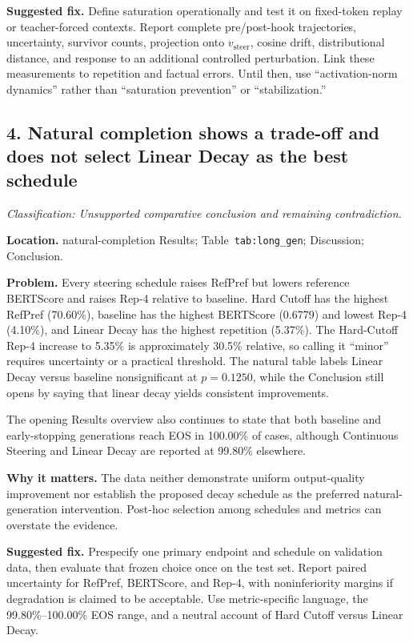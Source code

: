 \documentclass[11pt]{article}
\newcommand{\findinglabel}[1]{\textbf{#1}}
\newcommand{\classification}[1]{\textit{Classification: #1.}}
\begin{document}
\findinglabel{Suggested fix.} Define saturation operationally and test it on fixed-token replay or teacher-forced contexts.  Report complete pre/post-hook trajectories, uncertainty, survivor counts, projection onto $v_{\text{steer}}$, cosine drift, distributional distance, and response to an additional controlled perturbation.  Link these measurements to repetition and factual errors.  Until then, use ``activation-norm dynamics'' rather than ``saturation prevention'' or ``stabilization.''

\subsection*{4. Natural completion shows a trade-off and does not select Linear Decay as the best schedule}

\classification{Unsupported comparative conclusion and remaining contradiction}

\findinglabel{Location.} natural-completion Results; Table~\texttt{tab:long\_gen}; Discussion; Conclusion.

\findinglabel{Problem.} Every steering schedule raises RefPref but lowers reference BERTScore and raises Rep-4 relative to baseline.  Hard Cutoff has the highest RefPref (70.60\%), baseline has the highest BERTScore (0.6779) and lowest Rep-4 (4.10\%), and Linear Decay has the highest repetition (5.37\%).  The Hard-Cutoff Rep-4 increase to 5.35\% is approximately 30.5\% relative, so calling it ``minor'' requires uncertainty or a practical threshold.  The natural table labels Linear Decay versus baseline nonsignificant at $p=0.1250$, while the Conclusion still opens by saying that linear decay yields consistent improvements.

The opening Results overview also continues to state that both baseline and early-stopping generations reach EOS in 100.00\% of cases, although Continuous Steering and Linear Decay are reported at 99.80\% elsewhere.

\findinglabel{Why it matters.} The data neither demonstrate uniform output-quality improvement nor establish the proposed decay schedule as the preferred natural-generation intervention.  Post-hoc selection among schedules and metrics can overstate the evidence.

\findinglabel{Suggested fix.} Prespecify one primary endpoint and schedule on validation data, then evaluate that frozen choice once on the test set.  Report paired uncertainty for RefPref, BERTScore, and Rep-4, with noninferiority margins if degradation is claimed to be acceptable.  Use metric-specific language, the 99.80\%--100.00\% EOS range, and a neutral account of Hard Cutoff versus Linear Decay.
\end{document}
